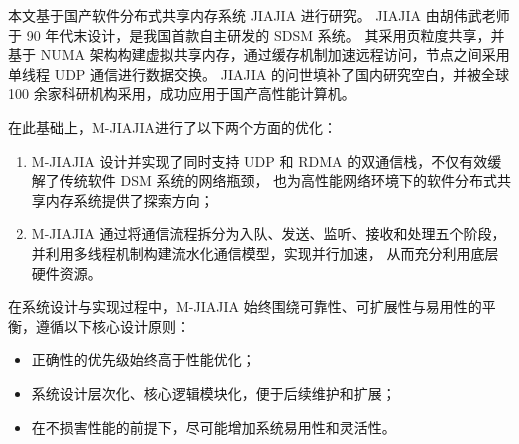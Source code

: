 {  %

  本文基于国产软件分布式共享内存系统 JIAJIA\citep{huweiwu2001sma,huweiwu2024ca,1999huweiwuJIAJIA} 进行研究。
  JIAJIA 由胡伟武老师于 90 年代末设计，是我国首款自主研发的 SDSM 系统。
  其采用页粒度共享，并基于 NUMA 架构构建虚拟共享内存，通过缓存机制加速远程访问，节点之间采用单线程 UDP 通信进行数据交换。
  JIAJIA 的问世填补了国内研究空白，并被全球 100 余家科研机构采用，成功应用于国产高性能计算机。

  在此基础上，M-JIAJIA进行了以下两个方面的优化：
  \begin{enumerate}
    \item M-JIAJIA 设计并实现了同时支持 UDP 和 RDMA 的双通信栈，不仅有效缓解了传统软件 DSM 系统的网络瓶颈，
          也为高性能网络环境下的软件分布式共享内存系统提供了探索方向；
    \item M-JIAJIA 通过将通信流程拆分为入队、发送、监听、接收和处理五个阶段，并利用多线程机制构建流水化通信模型，实现并行加速，
          从而充分利用底层硬件资源。
  \end{enumerate}

  在系统设计与实现过程中，M-JIAJIA 始终围绕可靠性、可扩展性与易用性的平衡，遵循以下核心设计原则：
  \begin{itemize}
    \item 正确性的优先级始终高于性能优化；
    \item 系统设计层次化、核心逻辑模块化，便于后续维护和扩展；
    \item 在不损害性能的前提下，尽可能增加系统易用性和灵活性。
  \end{itemize}

}
